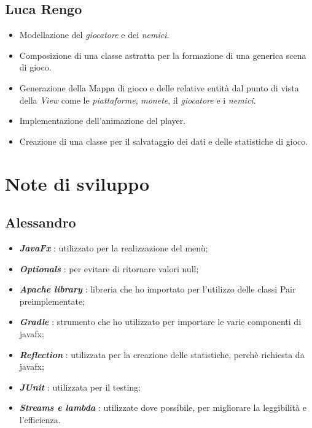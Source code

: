 \subsection*{Luca Rengo}

\begin{itemize}
	\item  \textsf{\small Modellazione del \emph{giocatore} e dei \emph{nemici}.}
	\item \textsf{\small Composizione di una classe astratta per la formazione di una generica scena di gioco.}
	\item \textsf{\small Generazione della Mappa di gioco e delle relative entità dal punto di vista della \emph{View} come le \emph{piattaforme}, \emph{monete}, il \emph{giocatore} e i \emph{nemici}.}
	\item \textsf{\small Implementazione dell'animazione del player.}
	\item \textsf{\small Creazione di una classe per il salvataggio dei dati e delle statistiche di gioco.}
\end{itemize}

\section{Note di sviluppo}

\subsection*{Alessandro}

\begin{itemize}
	\item  \textbf{\textit{JavaFx}} : utilizzato per la realizzazione del menù;
	\item \textbf{\textit{Optionals}} : per evitare di ritornare valori null;
	\item \textbf{\textit{Apache library}} : libreria che ho importato per l'utilizzo delle classi Pair preimplementate;
	\item \textbf{\textit{Gradle}} : strumento che ho utilizzato per importare le varie componenti di javafx;
	\item \textbf{\textit{Reflection}} : utilizzata per la creazione delle statistiche, perchè richiesta da javafx;
	\item \textbf{\textit{JUnit}} : utilizzata per il testing;
	\item \textbf{\textit{Streams e lambda}} : utilizzate dove possibile, per migliorare la leggibilità e l'efficienza.
\end{itemize}

